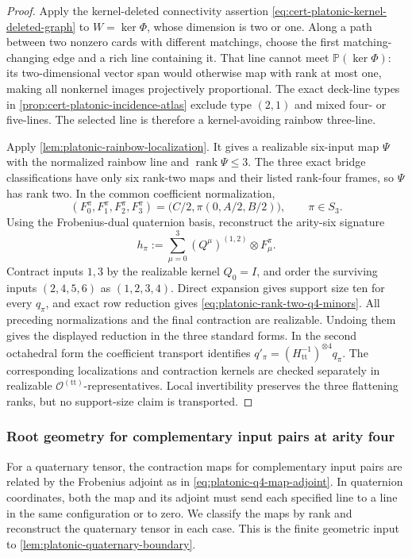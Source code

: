 \documentclass[11pt,letterpaper,onecolumn]{article}
\theoremstyle{plain}
\theoremstyle{definition}
\theoremstyle{remark}
\newcommand{\OctTT}{{\mathcal O^{(\mathrm{tt})}}}
\newcommand{\rank}{\operatorname{rank}}
\begin{document}
\begin{proof}
Apply the kernel-deleted connectivity assertion
\cref{eq:cert-platonic-kernel-deleted-graph} to
\(W=\ker\Phi\), whose dimension is two or one.  Along a path between two
nonzero cards with different matchings, choose the first matching-changing
edge and a rich line containing it.  That line cannot meet
\(\mathbb P(\ker\Phi)\): its two-dimensional vector span would otherwise
map with rank at most one, making all nonkernel images projectively
proportional.  The exact deck-line types in
\cref{prop:cert-platonic-incidence-atlas} exclude type \((2,1)\) and mixed
four- or five-lines.  The selected line is therefore a kernel-avoiding
rainbow three-line.

Apply \cref{lem:platonic-rainbow-localization}.  It gives a realizable
six-input map \(\Psi\) with the normalized rainbow line and
\(\rank\Psi\le3\).  The three exact bridge classifications have only six
rank-two maps and their listed rank-four frames, so \(\Psi\) has rank two.
In the common coefficient normalization,
\[
  (F^\pi_0,F^\pi_1,F^\pi_2,F^\pi_3)
  =\bigl(C/2,\pi(0,A/2,B/2)\bigr),
  \qquad \pi\in S_3.
\]
Using the Frobenius-dual quaternion basis, reconstruct the arity-six signature
\[
  h_\pi:=\sum_{\mu=0}^3(Q^\mu)^{(1,2)}\otimes F^\pi_\mu.
\]
Contract inputs \(1,3\) by the realizable kernel \(Q_0=I\), and order the
surviving inputs \((2,4,5,6)\) as \((1,2,3,4)\).  Direct expansion gives
support size ten for every \(q_\pi\), and exact row reduction gives
\cref{eq:platonic-rank-two-q4-minors}.  All preceding normalizations and
the final contraction are realizable. Undoing them gives the displayed
reduction in the three standard forms.  In the second octahedral form the
coefficient transport identifies
\(q'_\pi=(H_{\mathrm{tt}}^{-1})^{\otimes4}q_\pi\).  The corresponding
localizations and
contraction kernels are checked separately in realizable
\(\OctTT\)-representatives.  Local invertibility preserves the three
flattening ranks, but no support-size claim is transported.
\end{proof}

\subsubsection{Root geometry for complementary input pairs at arity four}
\label{proofsubsec:cert-platonic-q4-preservers}

For a quaternary tensor, the contraction maps for complementary input
pairs are related by the Frobenius adjoint as in
\cref{eq:platonic-q4-map-adjoint}. In quaternion coordinates, both the
map and its adjoint must send each specified line to a line in the same
configuration or to zero. We classify the maps by rank and reconstruct
the quaternary tensor in each case. This is the finite geometric input to
\cref{lem:platonic-quaternary-boundary}.
\end{document}
